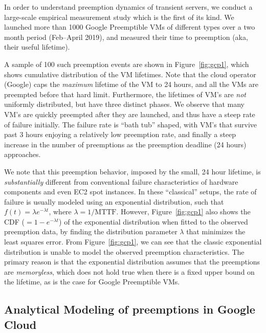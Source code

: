 In order to understand preemption dynamics of transient servers, we conduct a large-scale empirical measurement study which is the first of its kind. 
We launched more than 1000 Google Preemptible VMs of different types over a two month period (Feb--April 2019), and measured their time to preemption (aka, their useful lifetime).\footnotemark


A sample of 100 such preemption events are shown in Figure~\ref{fig:gcp1}, which shows cumulative distribution of the VM lifetimes. 
Note that the cloud operator (Google) caps the \emph{maximum} lifetime of the VM to 24 hours, and all the VMs are preempted before that hard limit.
Furthermore, the lifetimes of VM's are \emph{not} uniformly distributed, but have three distinct phases. 
We observe that many VM's are quickly preempted after they are launched, and thus have a steep rate of failure initially.
The failure rate is ``bath tub'' shaped, with VM's that survive past 3 hours enjoying a relatively low preemption rate, and finally a steep increase in the number of preemptions as the preemption deadline (24 hours) approaches. 


We note that this preemption behavior, imposed by the small, 24 hour  lifetime, is \emph{substantially} different from conventional failure characteristics of hardware components and even EC2 spot instances.
In these ``classical'' setups, the rate of failure is usually modeled using an exponential distribution, such that $f(t) = \lambda e^{-\lambda t}$, where $\lambda=1/\text{MTTF}$.
However, Figure~\ref{fig:gcp1} also shows the CDF ($=1-e^{-\lambda t}$) of the exponential distribution when fitted to the observed preemption data, by finding the distribution parameter $\lambda$ that minimizes the least squares error.
From Figure~\ref{fig:gcp1}, we can see that the classic exponential distribution is unable to model the observed preemption characteristics.
The primary reason is that the exponential distribution assumes that the preemptions are \emph{memoryless}, which does not hold true when there is a fixed upper bound on the lifetime, as is the case for Google Preemptible VMs.

\subsection{Analytical Modeling of preemptions in Google Cloud}

